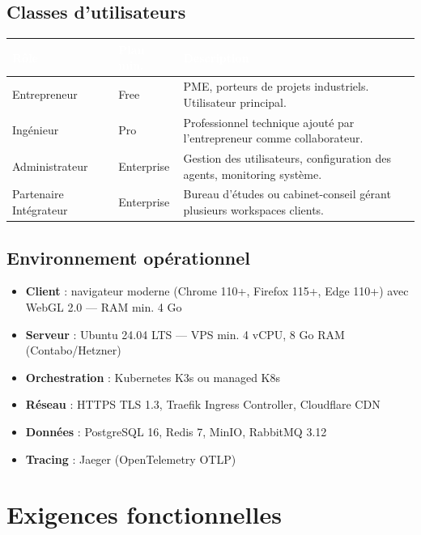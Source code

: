 \documentclass[12pt,a4paper]{article}
\begin{document}
\subsection{Classes d'utilisateurs}

\begin{tabularx}{\textwidth}{|l|l|X|}
\hline
\rowcolor{tablehead}\textcolor{white}{\textbf{Rôle}} & \textcolor{white}{\textbf{Plan min.}} & \textcolor{white}{\textbf{Description}} \\
\hline
Entrepreneur & Free & PME, porteurs de projets industriels. Utilisateur principal. \\
\hline
Ingénieur & Pro & Professionnel technique ajouté par l'entrepreneur comme collaborateur. \\
\hline
Administrateur & Enterprise & Gestion des utilisateurs, configuration des agents, monitoring système. \\
\hline
Partenaire Intégrateur & Enterprise & Bureau d'études ou cabinet-conseil gérant plusieurs workspaces clients. \\
\hline
\end{tabularx}

\subsection{Environnement opérationnel}

\begin{itemize}
  \item \textbf{Client} : navigateur moderne (Chrome 110+, Firefox 115+, Edge 110+) avec WebGL 2.0 — RAM min. 4 Go
  \item \textbf{Serveur} : Ubuntu 24.04 LTS — VPS min. 4 vCPU, 8 Go RAM (Contabo/Hetzner)
  \item \textbf{Orchestration} : Kubernetes K3s ou managed K8s
  \item \textbf{Réseau} : HTTPS TLS 1.3, Traefik Ingress Controller, Cloudflare CDN
  \item \textbf{Données} : PostgreSQL 16, Redis 7, MinIO, RabbitMQ 3.12
  \item \textbf{Tracing} : Jaeger (OpenTelemetry OTLP)
\end{itemize}

\section{Exigences fonctionnelles}
\end{document}
